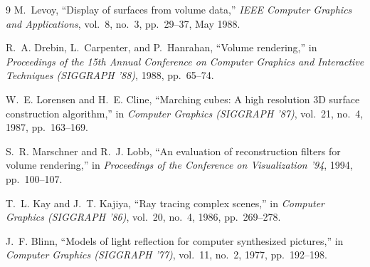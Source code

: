 \documentclass[10pt,twocolumn,a4paper]{article}
\begin{document}
\begin{thebibliography}{9}
M.~Levoy, ``Display of surfaces from volume data,'' \emph{IEEE Computer Graphics and Applications}, vol.~8, no.~3, pp.~29--37, May 1988.

R.~A. Drebin, L.~Carpenter, and P.~Hanrahan, ``Volume rendering,'' in \emph{Proceedings of the 15th Annual Conference on Computer Graphics and Interactive Techniques (SIGGRAPH '88)}, 1988, pp.~65--74.

W.~E. Lorensen and H.~E. Cline, ``Marching cubes: A high resolution 3D surface construction algorithm,'' in \emph{Computer Graphics (SIGGRAPH '87)}, vol.~21, no.~4, 1987, pp.~163--169.

S.~R. Marschner and R.~J. Lobb, ``An evaluation of reconstruction filters for volume rendering,'' in \emph{Proceedings of the Conference on Visualization '94}, 1994, pp.~100--107.

T.~L. Kay and J.~T. Kajiya, ``Ray tracing complex scenes,'' in \emph{Computer Graphics (SIGGRAPH '86)}, vol.~20, no.~4, 1986, pp.~269--278.

J.~F. Blinn, ``Models of light reflection for computer synthesized pictures,'' in \emph{Computer Graphics (SIGGRAPH '77)}, vol.~11, no.~2, 1977, pp.~192--198.
\end{thebibliography}
\end{document}
